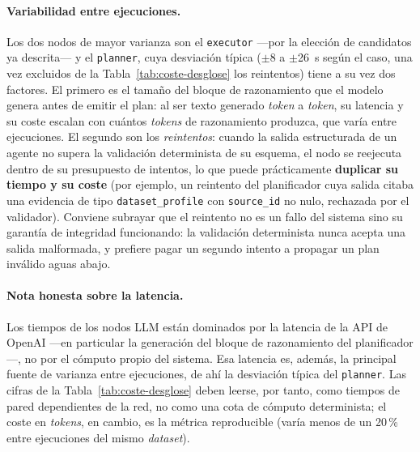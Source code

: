 \paragraph{Variabilidad entre ejecuciones.}
Los dos nodos de mayor varianza son el \texttt{executor} —por la elección de candidatos ya
descrita— y el \texttt{planner}, cuya desviación típica ($\pm$8 a $\pm$26~s según el caso,
una vez excluidos de la Tabla~\ref{tab:coste-desglose} los reintentos) tiene a su vez dos
factores. El primero es el tamaño del bloque de razonamiento que el
modelo genera antes de emitir el plan: al ser texto generado \textit{token} a \textit{token},
su latencia y su coste escalan con cuántos \textit{tokens} de razonamiento produzca, que
varía entre ejecuciones.
El segundo son los \emph{reintentos}: cuando la salida estructurada de un agente no supera
la validación determinista de su esquema, el nodo se reejecuta dentro de su presupuesto de
intentos, lo que puede prácticamente \textbf{duplicar su tiempo y su coste} (por ejemplo,
un reintento del planificador cuya salida citaba una evidencia de tipo
\texttt{dataset\_profile} con \texttt{source\_id} no nulo, rechazada por el validador).
Conviene subrayar que el reintento no es un fallo del sistema sino su garantía de
integridad funcionando: la validación determinista nunca acepta una salida malformada, y
prefiere pagar un segundo intento a propagar un plan inválido aguas abajo.

\paragraph{Nota honesta sobre la latencia.}
Los tiempos de los nodos LLM están dominados por la latencia de la API de OpenAI
—en particular la generación del bloque de razonamiento del planificador—, no por el
cómputo propio del sistema. Esa latencia es, además, la principal fuente de varianza entre
ejecuciones, de ahí la desviación típica del \texttt{planner}. Las cifras de la
Tabla~\ref{tab:coste-desglose} deben leerse, por tanto, como tiempos de pared dependientes
de la red, no como una cota de cómputo determinista; el coste en \textit{tokens}, en
cambio, es la métrica reproducible (varía menos de un 20\,\% entre ejecuciones del mismo
\textit{dataset}).

